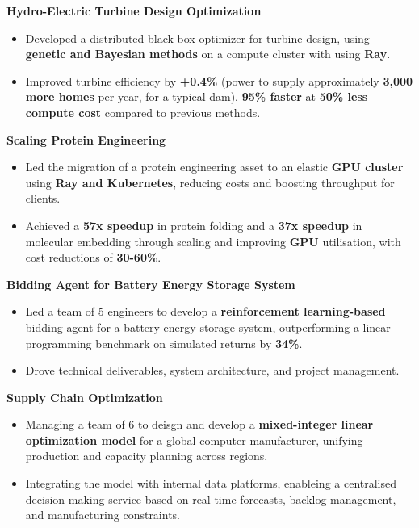 \documentclass[a4paper]{deedy-resume} %
\begin{document}
\begin{multicols}{2}

    \vspace{0.1cm}
    \textbf{Hydro-Electric Turbine Design Optimization}
    \begin{itemize}
        \item Developed a distributed black-box optimizer for turbine design, using \textbf{genetic and Bayesian methods} on a compute cluster with using \textbf{Ray}.
        \item Improved turbine efficiency by \textbf{+0.4\%} (power to supply approximately \textbf{3,000 more homes} per year, for a typical dam), \textbf{95\% faster} at \textbf{50\% less compute cost} compared to previous methods.
    \end{itemize}

    \vspace{0.2cm}
    \textbf{Scaling Protein Engineering}
    \begin{itemize}
        \item Led the migration of a protein engineering asset to an elastic \textbf{GPU cluster} using \textbf{Ray and Kubernetes}, reducing costs and boosting throughput for clients.
        \item Achieved a \textbf{57x speedup} in protein folding and a \textbf{37x speedup} in molecular embedding through scaling and improving \textbf{GPU} utilisation, with cost reductions of \textbf{30-60\%}.
    \end{itemize}


    \columnbreak


    \vspace{0.1cm}
    \textbf{Bidding Agent for Battery Energy Storage System}
    \begin{itemize}
        \item Led a team of 5 engineers to develop a \textbf{reinforcement learning-based} bidding agent for a battery energy storage system, outperforming a linear programming benchmark on simulated returns by \textbf{34\%}.
        \item Drove technical deliverables, system architecture, and project management.
    \end{itemize}

    \vspace{0.2cm}
    \textbf{Supply Chain Optimization}
    \begin{itemize}
        \item Managing a team of 6 to deisgn and develop a \textbf{mixed-integer linear optimization model} for a global computer manufacturer, unifying production and capacity planning across regions.
        \item Integrating the model with internal data platforms, enableing a centralised decision-making service based on real-time forecasts, backlog management, and manufacturing constraints.
    \end{itemize}
   
\end{multicols}
\end{document}

